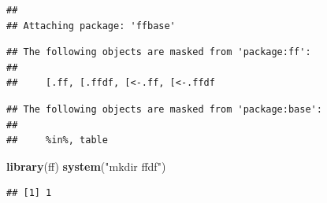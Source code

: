 \documentclass[
]{article}
\newenvironment{Shaded}{\begin{snugshade}}{\end{snugshade}}
\newcommand{\CharTok}[1]{\textcolor[rgb]{0.31,0.60,0.02}{#1}}
\newcommand{\CommentTok}[1]{\textcolor[rgb]{0.56,0.35,0.01}{\textit{#1}}}
\newcommand{\DataTypeTok}[1]{\textcolor[rgb]{0.13,0.29,0.53}{#1}}
\newcommand{\KeywordTok}[1]{\textcolor[rgb]{0.13,0.29,0.53}{\textbf{#1}}}
\newcommand{\NormalTok}[1]{#1}
\newcommand{\OperatorTok}[1]{\textcolor[rgb]{0.81,0.36,0.00}{\textbf{#1}}}
\newcommand{\OtherTok}[1]{\textcolor[rgb]{0.56,0.35,0.01}{#1}}
\newcommand{\StringTok}[1]{\textcolor[rgb]{0.31,0.60,0.02}{#1}}
\begin{document}
\begin{verbatim}
## 
## Attaching package: 'ffbase'
\end{verbatim}

\begin{verbatim}
## The following objects are masked from 'package:ff':
## 
##     [.ff, [.ffdf, [<-.ff, [<-.ffdf
\end{verbatim}

\begin{verbatim}
## The following objects are masked from 'package:base':
## 
##     %in%, table
\end{verbatim}

\begin{Shaded}
\begin{Highlighting}[]
\KeywordTok{library}\NormalTok{(ff)}
\KeywordTok{system}\NormalTok{(}\StringTok{"mkdir ffdf"}\NormalTok{)}
\end{Highlighting}
\end{Shaded}

\begin{verbatim}
## [1] 1
\end{verbatim}

\begin{Shaded}
\end{Shaded}
\end{document}
